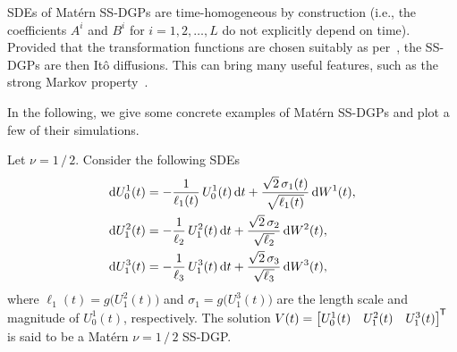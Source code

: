 SDEs of Mat\'{e}rn SS-DGPs are time-homogeneous by construction (i.e., the coefficients $A^i$ and $B^i$ for $i=1,2,\ldots,L$ do not explicitly depend on time). Provided that the transformation functions are chosen suitably as per~\citet[][Definition~7.1.1]{Oksendal2003}, the \matern SS-DGPs are then It\^{o} diffusions. This can bring many useful features, such as the strong Markov property~\citep{Ikeda1992}. 

In the following, we give some concrete examples of Mat\'{e}rn SS-DGPs and plot a few of their simulations. 

\begin{example}[Mat\'{e}rn $\nu=1\,/\,2$ SS-DGP with three GP elements]
	\label{example:ssdgp-m12}
	Let $\nu=1\, / \, 2$. Consider the following SDEs
	\begin{equation}
		\begin{split}
			\diff U^1_0(t) &= -\frac{1}{\ell_1(t)}\,U^1_0(t) \diff t + \frac{\sqrt{2} \, \sigma_1(t)}{\sqrt{\ell_1(t)}} \diff W^1(t),\\
			\diff U^2_1(t) &= -\frac{1}{\ell_2}\,U^2_1(t) \diff t + \frac{\sqrt{2} \, \sigma_2}{\sqrt{\ell_2}} \diff W^2(t),\\
			\diff U^3_1(t) &= -\frac{1}{\ell_3}\,U^3_1(t) \diff t + \frac{\sqrt{2} \, \sigma_3}{\sqrt{\ell_3}} \diff W^3(t),
		\end{split}
		\label{equ:ss-dgp-m12}
	\end{equation}
	where $\ell_1(t) = g\big( U^2_1(t) \big)$ and $\sigma_1 = g\big( U^3_1(t) \big)$ are the length scale and magnitude of $U^1_0(t)$, respectively. The solution $V(t) = \begin{bmatrix}
		U^1_0(t) & U^2_1(t) & U^3_1(t)
	\end{bmatrix}^{\mkern-1.5mu\mathsf{T}}$ is said to be a Mat\'{e}rn $\nu=1\,/\,2$ SS-DGP. 
\end{example}


